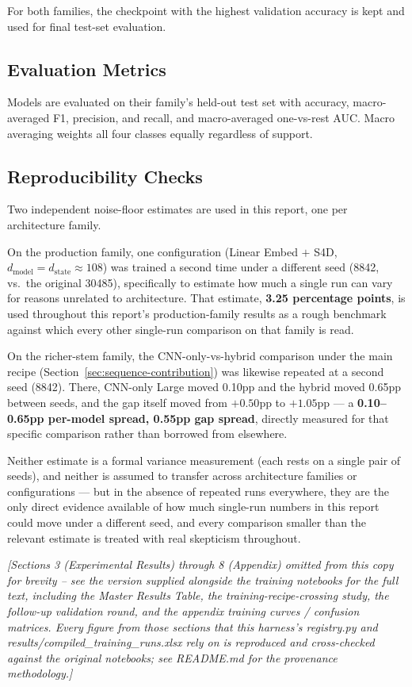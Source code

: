 \documentclass[11pt]{article}
\begin{document}
For both families, the checkpoint with the highest validation accuracy is kept and used for
final test-set evaluation.

\subsection{Evaluation Metrics}
Models are evaluated on their family's held-out test set with accuracy, macro-averaged F1,
precision, and recall, and macro-averaged one-vs-rest AUC. Macro averaging weights all four
classes equally regardless of support.

\subsection{Reproducibility Checks}
\label{sec:methodology-repro}
Two independent noise-floor estimates are used in this report, one per architecture family.

On the production family, one configuration (Linear Embed $+$ S4D,
$d_{\text{model}}{=}d_{\text{state}}{\approx}108$) was trained a second time under a different
seed (8842, vs.\ the original 30485), specifically to estimate how much a single run can vary
for reasons unrelated to architecture. That estimate, \textbf{3.25 percentage points}, is used
throughout this report's production-family results as a rough benchmark against which every
other single-run comparison on that family is read.

On the richer-stem family, the CNN-only-vs-hybrid comparison under the main recipe
(Section~\ref{sec:sequence-contribution}) was likewise repeated at a second seed (8842). There,
CNN-only Large moved 0.10pp and the hybrid moved 0.65pp between seeds, and the gap itself
moved from $+0.50$pp to $+1.05$pp --- a \textbf{0.10--0.65pp per-model spread, 0.55pp
gap spread}, directly measured for that specific comparison rather than borrowed from
elsewhere.

Neither estimate is a formal variance measurement (each rests on a single pair of seeds), and
neither is assumed to transfer across architecture families or configurations --- but in the
absence of repeated runs everywhere, they are the only direct evidence available of how much
single-run numbers in this report could move under a different seed, and every comparison
smaller than the relevant estimate is treated with real skepticism throughout.

\emph{[Sections 3 (Experimental Results) through 8 (Appendix) omitted from this copy for
brevity -- see the version supplied alongside the training notebooks for the full text,
including the Master Results Table, the training-recipe-crossing study, the follow-up
validation round, and the appendix training curves / confusion matrices. Every figure from
those sections that this harness's registry.py and results/compiled_training_runs.xlsx rely
on is reproduced and cross-checked against the original notebooks; see README.md for the
provenance methodology.]}
\end{document}
